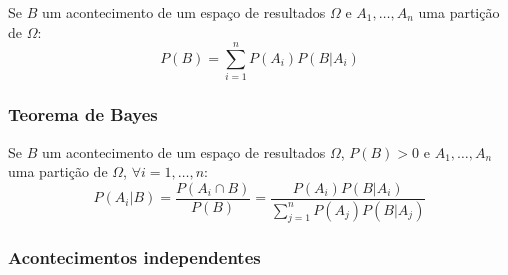 \documentclass{article}
\begin{document}
Se $B$ um acontecimento de um espaço de resultados $\Omega$ e $A_1, \dots, A_n$ uma partição de $\Omega$:
$$ P(B) = \sum_{i=1}^n P(A_i)P(B|A_i) $$

\subsubsection*{Teorema de Bayes}

Se $B$ um acontecimento de um espaço de resultados $\Omega$, $P(B) > 0$ e $A_1, \dots, A_n$ uma partição de $\Omega$, $\forall i = 1, \dots, n$:
$$ P(A_i|B) = \frac{P(A_i \cap B)}{P(B)} = \frac{P(A_i)P(B|A_i)}{\sum_{j=1}^{n} P(A_j)P(B|A_j)} $$

\subsubsection*{Acontecimentos independentes}
\end{document}
